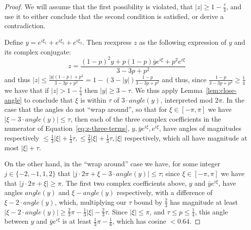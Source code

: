 \documentclass[11pt]{article}
\theoremstyle{plain}
\begin{document}
\begin{proof}
We will assume that the first possibility is violated, that $|z|\geq 1-\frac{\tau}{4}$, and use it to either conclude that the second condition is satisfied, or derive a contradiction.

Define $y=e^{i\xi_1}+e^{i\xi_2}+e^{i\xi_3}$. Then reexpress $z$ as the following expression of $y$ and its complex conjugate: \begin{equation}\label{eq:z-three-terms}z=\frac{(1-p)^2y+p(1-p)\overline{y}e^{i\xi}+p^2e^{i\xi}}{3-3p+p^2}\end{equation}
and thus $|z|\leq \frac{|y|(1-p)+p^2}{3-3p+p^2}=1-(3-|y|)\frac{1-p}{3-3p+p^2}$ and thus, since $\frac{1-p}{3-3p+p^2}\geq \frac{1}{4}$ we have that if $|z|>1-\frac{\tau}{4}$ then $|y|\geq 3-\tau$. We thus apply Lemma~\ref{lem:close-angle} to conclude that $\xi$ is within $\tau$ of $3 \cdot angle(y)$, interpreted mod $2\pi$. 
In the case that the angles do not ``wrap around'', so that for $\xi\in[-\pi,\pi]$ we have $|\xi-3\cdot angle(y)|\leq  \tau$, then each of the three complex coefficients in the numerator of Equation~\ref{eq:z-three-terms}, $y, \bar{y}e^{i\xi},e^{i\xi}$, have angles of magnitudes respectively $\leq \frac{1}{3}|\xi|+\frac{1}{3}\tau, \leq \frac{2}{3}|\xi|+\frac{1}{3}\tau, |\xi|$ respectively, which all have magnitude at most $|\xi|+\tau$.

On the other hand, in the ``wrap around'' case we have, for some integer $j\in\{-2,-1,1,2\}$ that $|j\cdot 2\pi+\xi-3\cdot angle(y)|\leq  \tau$; since $\xi\in[-\pi,\pi]$ we have that $|j\cdot 2\pi+\xi|\geq \pi$. The first two complex coefficients above, $y$ and  $\bar{y}e^{i\xi}$, have angles $angle(y)$ and $\xi-angle(y)$ respectively, with a difference of $\xi-2\cdot angle(y)$, which, multiplying our $\tau$ bound by $\frac{2}{3}$ has magnitude at least $|\xi-2\cdot angle(y)|\geq \frac{2}{3}\pi-\frac{1}{3}|\xi|-\frac{2}{3}\tau$. Since $|\xi|\leq\pi$, and $\tau\leq p\leq\frac{1}{4}$, this angle between $y$ and $\bar{y}e^{i\xi}$ is at least $\frac{1}{3}\pi-\frac{1}{6}$, which has cosine $<0.64$. 


\end{proof}
\end{document}
